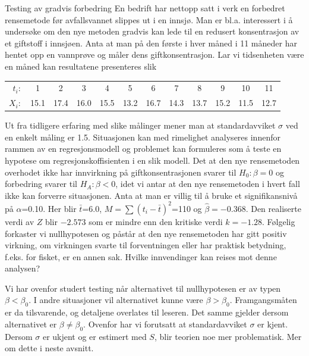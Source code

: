 \begin{eksempel}{Testing av gradvis forbedring}
En bedrift har nettopp satt i verk en forbedret rensemetode
før avfallsvannet slippes ut i en innsjø.  Man er bl.a.  
interessert i å undersøke om den nye metoden gradvis kan
lede til en redusert konsentrasjon av et giftstoff i innsjøen. 
Anta at man på den første i hver måned i 11
måneder har hentet opp en vannprøve og måler dens
giftkonsentrasjon. Lar vi tidsenheten være en måned kan
resultatene presenteres slik

\begin{center} \addtolength{\tabcolsep}{-0.2\tabcolsep}
\begin{tabular}{rccccccccccc}
$t_i:$&   1 & 2  & 3  & 4  & 5 &  6 &  7  & 8  & 9  &  10 & 11 \\
$X_i:$& 15.1&17.4&16.0&15.5&13.2&16.7&14.3&13.7&15.2&11.5&12.7
\end{tabular}
\end{center}
Ut fra tidligere erfaring med slike målinger mener man at
standardavviket $\sigma$ ved en enkelt måling er 1.5.
Situasjonen kan med rimelighet analyseres innenfor rammen av en
regresjonsmodell og problemet kan formuleres som å teste en
hypotese om regresjonskoffisienten i en slik modell. Det at den
nye rensemetoden overhodet ikke har innvirkning på
giftkonsentrasjonen svarer til $H_0:\beta =0$ og forbedring svarer
til $H_A:\beta <0$, idet vi antar at den nye rensemetoden i hvert
fall ikke kan forverre situasjonen. Anta at man er villig til
å bruke et signifikansnivå på $\alpha$=0.10. 
Her blir $\bar{t}$=6.0, $M=\sum (t_i-\bar{t})^2$=110 og $\hat{\beta}=-0.368$.
Den realiserte verdi av $Z$ blir $-2.573$ som er mindre enn den
kritiske verdi $k=-1.28$. Følgelig forkaster vi nullhypotesen
og påstår at den nye rensemetoden har gitt positiv
virkning, om virkningen svarte til forventningen eller har
praktisk betydning, f.eks. for fisket, er en annen sak. 
Hvilke innvendinger kan reises mot denne analysen?
\end{eksempel}

Vi har ovenfor studert testing når alternativet til
nullhypotesen er av typen $\beta< \beta_0$. I andre situasjoner
vil alternativet kunne være $\beta>\beta_0$.
Framgangsmåten er da tilsvarende, og detaljene overlates til
leseren. Det samme gjelder dersom alternativet er $\beta \not
=\beta_0$. Ovenfor har vi forutsatt at standardavviket $\sigma$
er kjent. Dersom $\sigma$ er ukjent og er estimert med $S$, blir
teorien noe mer problematisk. Mer om dette i neste avsnitt.


